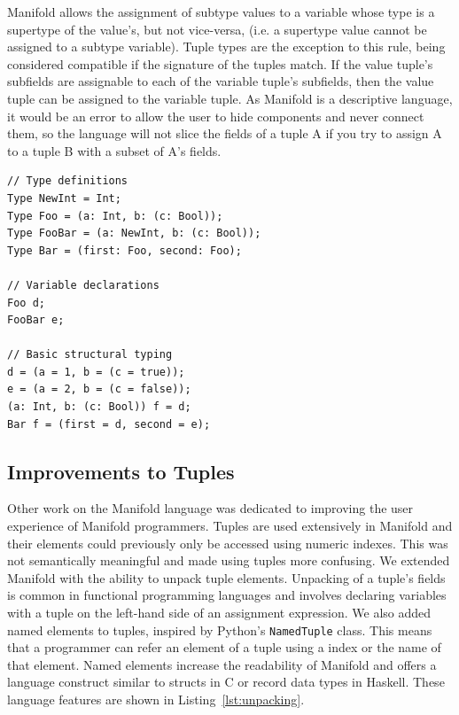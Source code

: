Manifold allows the assignment of subtype values to a variable whose type is a
supertype of the value's, but not vice-versa, (i.e. a supertype value cannot be
assigned to a subtype variable).
Tuple types are the exception to this rule, being
considered compatible if the signature of the tuples
match. If the value tuple's subfields are assignable to each of the
variable tuple's subfields, then the value tuple can be assigned to the variable
tuple. As Manifold is a descriptive language, it would be an error to allow
the user to hide components and never connect them, so the language will not slice
the fields of a tuple A if you try to assign A to a tuple B with a subset of A's
fields.

\begin{lstlisting}[label=lst:types,caption=Example of types in a Manifold file]
// Type definitions
Type NewInt = Int;
Type Foo = (a: Int, b: (c: Bool));
Type FooBar = (a: NewInt, b: (c: Bool));
Type Bar = (first: Foo, second: Foo);

// Variable declarations
Foo d;
FooBar e;

// Basic structural typing
d = (a = 1, b = (c = true));
e = (a = 2, b = (c = false));
(a: Int, b: (c: Bool)) f = d;
Bar f = (first = d, second = e);
\end{lstlisting}


\subsection{Improvements to Tuples}

Other work on the Manifold language was dedicated to improving the user experience
of Manifold programmers. Tuples are used extensively in Manifold and their
elements could previously only be accessed using numeric indexes. This was not
semantically meaningful and made using tuples more confusing. We extended
Manifold with the ability to unpack tuple elements. Unpacking of a tuple's
fields is common in functional programming languages and involves declaring
variables with a tuple on the left-hand side of an assignment expression. We
also added named elements to tuples, inspired by Python's \texttt{NamedTuple}
class. This means that a programmer can refer an element of a tuple using a
index or the name of that element. Named elements increase the readability of
Manifold and offers a language construct similar to structs in C or record
data types in Haskell. These language features are shown in Listing~\ref{lst:unpacking}.

